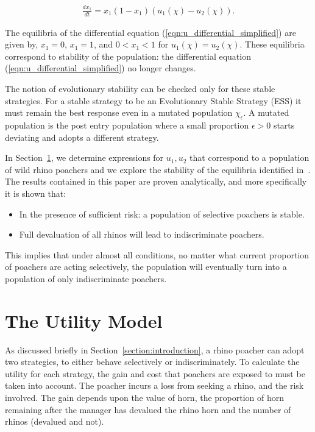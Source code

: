 \documentclass[10pt]{article}
\begin{document}
\begin{eqnarray}
    \label{eqn:u_differential_simplified}
    \frac{dx_1}{dt}= x_1(1 - x_1)(u_1(\chi) - u_2(\chi)).
\end{eqnarray}

The equilibria of the differential equation (\ref{eqn:u_differential_simplified})
are given by, \(x_1=0\), \(x_1=1\), and \(0<x_1<1\) for \(u_1(\chi)=u_2(\chi)\).
These equilibria correspond to stability of the population: the differential
equation (\ref{eqn:u_differential_simplified}) no longer changes.

The notion of evolutionary stability can be checked only for these stable strategies.
For a stable strategy to be an Evolutionary Stable Strategy (ESS) it must remain
the best response even in a mutated population \(\chi_\epsilon\). A mutated population
is the post entry population
where a small proportion \(\epsilon > 0\) starts deviating and adopts a different strategy.

In Section~\ref{section:the_model}, we determine expressions
for \(u_1, u_2\) that correspond to a population of wild rhino poachers and we
explore the stability of the equilibria identified in~\cite{Lee}. The results
contained in this paper are proven analytically, and more specifically it is
shown that:

\begin{itemize}
    \item In the presence of sufficient risk: a population of selective poachers
        is stable.
    \item Full devaluation of all rhinos will lead to indiscriminate poachers.
\end{itemize}

This implies that under almost all conditions, no matter what current proportion
of poachers are acting selectively, the population will eventually turn into a
population of only indiscriminate poachers.

\section{The Utility Model}\label{section:the_model}

As discussed briefly in Section~\ref{section:introduction}, a rhino poacher
can adopt two strategies, to either behave selectively
or indiscriminately. To calculate the utility for each strategy, the gain and cost
that poachers are exposed to must be taken into account. The poacher incurs a
loss from seeking a rhino, and the risk involved. The gain depends upon the value
of horn, the proportion of horn remaining after the manager has devalued the
rhino horn and the number of rhinos (devalued and not).
\end{document}

